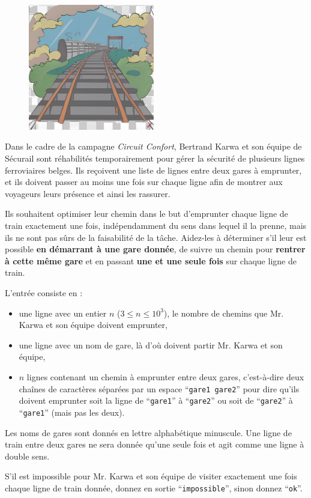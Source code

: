 \problemname{\problemyamlname}

\begin{figure}
	\centering
	\includegraphics[width=5.5cm]{railway.jpg}
\end{figure}
Dans le cadre de la campagne \emph{Circuit Confort}, Bertrand Karwa et son équipe de Sécurail sont réhabilités
temporairement pour gérer la sécurité de plusieurs lignes ferroviaires belges. Ils reçoivent une liste de lignes
entre deux gares à emprunter, et ils doivent passer au moins une fois sur chaque ligne afin de montrer aux
voyageurs leurs présence et ainsi les rassurer.

Ils souhaitent optimiser leur chemin dans le but d'emprunter chaque ligne de train exactement une fois, indépendamment du sens dans lequel il la prenne, mais ils ne sont pas sûrs
de la faisabilité de la tâche. Aidez-les à déterminer s'il leur est possible \textbf{en démarrant à une gare donnée}, de suivre un chemin pour \textbf{rentrer à cette même gare} et en passant \textbf{une et une seule fois} sur chaque ligne de train.

\begin{Input}
	L'entrée consiste en :
	\begin{itemize}
		\item une ligne avec un entier $n$ ($3 \le n \le 10^3$), le nombre de chemins que Mr. Karwa et son équipe doivent emprunter,
		\item une ligne avec un nom de gare, là d'où doivent partir Mr. Karwa et son équipe,
		\item $n$ lignes contenant un chemin à emprunter entre deux gares, c'est-à-dire deux chaînes de caractères séparées par un espace ``\verb|gare1 gare2|'' pour dire qu'ils doivent emprunter soit la ligne de ``\verb|gare1|'' à ``\verb|gare2|'' ou soit de ``\verb|gare2|'' à ``\verb|gare1|'' (mais pas les deux).
	\end{itemize}
	Les noms de gares sont donnés en lettre alphabétique minuscule.
	Une ligne de train entre deux gares ne sera donnée qu'une seule fois et agit comme une ligne à double sens.
\end{Input}

\begin{Output}
	S'il est impossible pour Mr. Karwa et son équipe de visiter exactement une fois chaque ligne de train donnée, donnez en sortie ``\verb|impossible|'', sinon donnez ``\verb|ok|''.
\end{Output}
